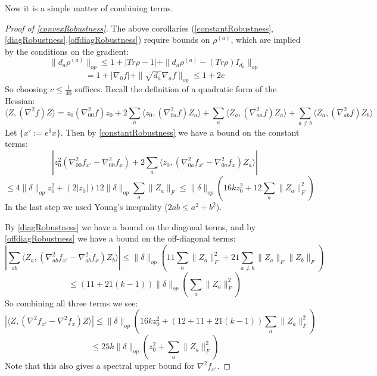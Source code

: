 \documentclass[aos]{imsart}
\theoremstyle{definition}
\numberwithin{equation}{section}
\newcommand{\samp}{x}
\newcommand{\CF}[1]{{\color{purple}[CF: #1]}}
\newcommand{\AR}[1]{{\color{orange}[AR: #1]}}
\begin{document}
\begin{appendix}
Now it is a simple matter of combining terms.

\begin{proof} [Proof of \cref{convexRobustness}]
The above corollaries (\ref{constantRobustness},\ref{diagRobustness},\ref{offdiagRobustness}) require bounds on $\rho^{(a)}$, which are implied by the conditions on the gradient:
\[ \|d_{a} \rho^{(a)}\|_{op} \leq 1 + |Tr \rho - 1| + \|d_{a} \rho^{(a)} - (Tr \rho) I_{d_{a}} \|_{op}    \]
\[ = 1 + |\nabla_{0} f| + \|\sqrt{d_{a}} \nabla_{a} f\|_{op} \leq 1 + 2c     \]
So choosing $c \leq \frac{1}{40}$ suffices. 
Recall the definition of a quadratic form of the Hessian:
\[ \langle Z, (\nabla^{2} f) Z \rangle = z_{0} (\nabla^{2}_{00} f) z_{0} + 2 \sum_{a} \langle z_{0}, (\nabla^{2}_{0a} f) Z_{a} \rangle + \sum_{a} \langle Z_{a}, (\nabla^{2}_{aa} f) Z_{a} \rangle + \sum_{a \neq b} \langle Z_{a}, (\nabla^{2}_{ab} f) Z_{b} \rangle     \]
Let $\{\samp' := e^{\delta} \samp\}$. Then by \cref{constantRobustness} we have a bound on the constant terms:
\[ | z_{0}^{2} (\nabla^{2}_{00} f_{\samp'} - \nabla^{2}_{00} f_{\samp} ) + 2 \sum_{a} \langle z_{0}, (\nabla^{2}_{0a} f_{\samp'} - \nabla^{2}_{0a} f_{\samp}) Z_{a} \rangle |      \]
\[ \leq 4 \|\delta\|_{op} z_{0}^{2} + (2 |z_{0}|) 12 \|\delta\|_{op} \sum_{a} \|Z_{a}\|_{F}
\leq \|\delta\|_{op} (16 k z_{0}^{2} + 12 \sum_{a} \|Z_{a}\|_{F}^{2})   \]
In the last step we used Young's inequality ($2ab \leq a^{2} + b^{2}$).

By \cref{diagRobustness} we have a bound on the diagonal terms, and by \cref{offdiagRobustness} we have a bound on the off-diagonal terms:
\[ |\sum_{ab} \langle Z_{a}, (\nabla^{2}_{ab} f_{\samp'} - \nabla^{2}_{ab} f_{\samp} ) Z_{b} \rangle | \leq \|\delta\|_{op} \left( 11 \sum_{a} \|Z_{a}\|_{F}^{2} + 21 \sum_{a \neq b} \|Z_{a}\|_{F} \|Z_{b}\|_{F} \right)   \]
\[ \leq (11 + 21(k-1)) \|\delta\|_{op} \left( \sum_{a} \|Z_{a}\|_{F}^{2} \right)   \]
So combining all three terms we see:
\[ |\langle Z, (\nabla^{2} f_{\samp'} - \nabla^{2} f_{\samp} ) Z \rangle | \leq \|\delta\|_{op} \left( 16 k z_{0}^{2} + (12 + 11 + 21 (k-1)) \sum_{a} \|Z_{a}\|_{F}^{2} \right)    \]
\[ \leq 25 k \|\delta\|_{op} \left( z_{0}^{2} + \sum_{a} \|Z_{a}\|_{F}^{2} \right)    \]
Note that this also gives a spectral upper bound for $\nabla^{2} f_{\samp'}$.
\end{proof}


\end{appendix}
\end{document}
